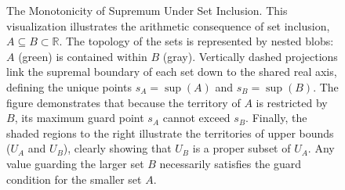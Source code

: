 \begin{figure}[H]

\caption{The Monotonicity of Supremum Under Set Inclusion.
This visualization illustrates the arithmetic consequence of set inclusion, $A \subseteq B \subset \mathbb{R}$. The topology of the sets is represented by nested blobs: $A$ (green) is contained within $B$ (gray). Vertically dashed projections link the supremal boundary of each set down to the shared real axis, defining the unique points $s_A = \operatorname{sup}(A)$ and $s_B = \operatorname{sup}(B)$. The figure demonstrates that because the territory of $A$ is restricted by $B$, its maximum guard point $s_A$ cannot exceed $s_B$. Finally, the shaded regions to the right illustrate the territories of upper bounds ($U_A$ and $U_B$), clearly showing that $U_B$ is a proper subset of $U_A$. Any value guarding the larger set $B$ necessarily satisfies the guard condition for the smaller set $A$.}
\label{fig:supremum-algebra}
\end{figure}

